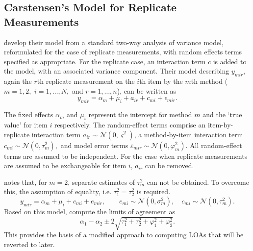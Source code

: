 \documentclass[12pt, a4paper]{report}
\theoremstyle{plain}
\theoremstyle{definition}
\theoremstyle{remark}
\begin{document}
\subsection{Carstensen's Model for Replicate Measurements}



\citet{BXC2008} develop their model from a standard two-way analysis of variance model, reformulated for the case of replicate measurements, with random effects terms specified as appropriate. 
For the replicate case, an interaction term $c$ is added to the model, with an associated variance component. Their model describing $y_{mir} $, again the $r$th replicate measurement on the $i$th item by the $m$th method ($m=1,2,$ $i=1,\ldots,N,$ and $r = 1,\ldots,n$), can be written as
\begin{equation}\label{BXC-model}
y_{mir}  = \alpha_{m} + \mu_{i} + a_{ir} + c_{mi} + \epsilon_{mir}.
\end{equation}

The fixed effects $\alpha_{m}$ and $\mu_{i}$ represent the intercept for method $m$ and the `true value' for item $i$ respectively. The random-effect terms comprise an item-by-replicate interaction term $a_{ir} \sim \mathcal{N}(0,\varsigma^{2})$, a method-by-item interaction term $c_{mi} \sim \mathcal{N}(0,\tau^{2}_{m}),$ and model error terms $\varepsilon_{mir} \sim \mathcal{N}(0,\varphi^{2}_{m}).$ All random-effect terms are assumed to be independent. For the case when replicate measurements are assumed to be exchangeable for item $i$, $a_{ir}$ can be removed. 



\citet{BXC2008} notes that, for $m=2$, separate estimates of $\tau^2_m$ can not be obtained. To overcome this, the assumption of equality, i.e. $\tau^2_1 = \tau^2_2$ is required.
\begin{equation}
y_{mir}  = \alpha_{m} + \mu_{i} + c_{mi} + e_{mir}, \qquad  e_{mi}
\sim \mathcal{N}(0,\sigma^{2}_{m}), \quad c_{mi} \sim \mathcal{N}(0,\tau^{2}_{m}).
\end{equation}
Based on this model, \citet{BXC2008} compute the limits of agreement as
\begin{equation}
\alpha_1 - \alpha_2 \pm 2 \sqrt{ \tau^2_1 +  \tau^2_2 +  \varphi^2_1 +  \varphi^2_2 }.
\end{equation}
This provides the basis of a modified approach to computing LOAs that will be reverted to later.





\end{document}
